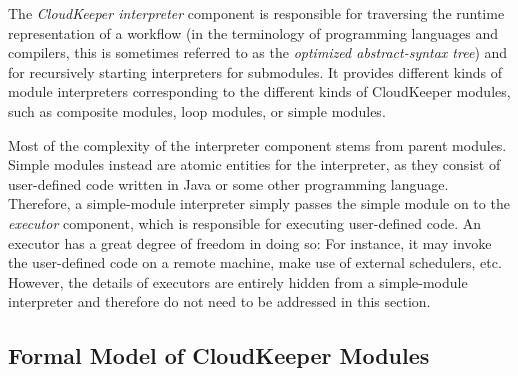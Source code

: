 \documentclass[paper=letter,fontsize=11pt,captions=tableheading]{scrartcl}
\numberwithin{equation}{section}
\theoremstyle{algorithm}
\theoremstyle{plain}
\theoremstyle{nonumberplain}
\begin{document}
The \emph{CloudKeeper interpreter} component is responsible for traversing the runtime representation of a workflow (in the terminology of programming languages and compilers, this is sometimes referred to as the \emph{optimized abstract-syntax tree}) and for recursively starting interpreters for submodules. It provides different kinds of module interpreters corresponding to the different kinds of CloudKeeper modules, such as composite modules, loop modules, or simple modules.

Most of the complexity of the interpreter component stems from parent modules. Simple modules instead are atomic entities for the interpreter, as they consist of user-defined code written in Java or some other programming language. Therefore, a simple-module interpreter simply passes the simple module on to the \emph{executor} component, which is responsible for executing user-defined code. An executor has a great degree of freedom in doing so: For instance, it may invoke the user-defined code on a remote machine, make use of external schedulers, etc. However, the details of executors are entirely hidden from a simple-module interpreter and therefore do not need to be addressed in this section.

\subsection{Formal Model of CloudKeeper Modules}

\newcommand{\children}[1]{\operatorname{ch}(#1)}
\newcommand{\ports}[1]{\operatorname{ports}(#1)}
\newcommand{\conn}[1]{\operatorname{conn}(#1)}
\newcommand{\dir}[1]{\operatorname{dir}(#1)}
\newcommand{\incoming}{\text{in}}
\newcommand{\outgoing}{\text{out}}
\newcommand{\fromport}[1]{\operatorname{from}(#1)}
\newcommand{\toport}[1]{\operatorname{to}(#1)}
\newcommand{\module}[1]{\operatorname{module}(#1)}
\newcommand{\deps}{\operatorname{deps}}
\newcommand{\val}{\ensuremath{\bullet}} %
\newcommand{\optv}{\ensuremath{\circ}} %
\newcommand{\nval}{\ensuremath{\cdot}} %
\newcommand{\pred}{\operatorname{pred}}
\newcommand{\suc}{\operatorname{suc}}
\newcommand{\state}{\mathit{state}}
\newcommand{\irrelevant}{\mathit{irrelevant}}
\newcommand{\ready}{\mathit{ready}}
\newcommand{\recompute}{\mathit{recompute}}
\newcommand{\outports}{\operatorname{outports}}
\newcommand{\Cparentchild}{C_{\uparrow}}
\newcommand{\Csibling}{C^{\to}}
\newcommand{\Cchildparent}{C^{\downarrow}}
\newcommand{\Cshort}{C_{\to}}
\end{document}
